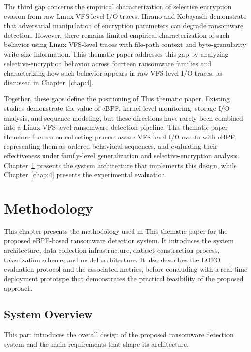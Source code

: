 The third gap concerns the empirical characterization of selective encryption evasion from raw Linux VFS-level I/\allowbreak{}O traces. Hirano and Kobayashi \cite{ref8} demonstrate that adversarial manipulation of encryption parameters can degrade ransomware detection. However, there remains limited empirical characterization of such behavior using Linux VFS-level traces with file-path context and byte-granularity write-size information. This thematic paper addresses this gap by analyzing selective-encryption behavior across fourteen ransomware families and characterizing how such behavior appears in raw VFS-level I/\allowbreak{}O traces, as discussed in Chapter~\ref{chap:4}.

Together, these gaps define the positioning of This thematic paper. Existing studies demonstrate the value of eBPF, kernel-level monitoring, storage I/\allowbreak{}O analysis, and sequence modeling, but these directions have rarely been combined into a Linux VFS-level ransomware detection pipeline. This thematic paper therefore focuses on collecting process-aware VFS-level I/\allowbreak{}O events with eBPF, representing them as ordered behavioral sequences, and evaluating their effectiveness under family-level generalization and selective-encryption analysis. Chapter~\ref{chap:3} presents the system architecture that implements this design, while Chapter~\ref{chap:4} presents the experimental evaluation.

\chapter{Methodology}\label{chap:3}

This chapter presents the methodology used in This thematic paper for the proposed eBPF-based ransomware detection system. It introduces the system architecture, data collection infrastructure, dataset construction process, tokenization scheme, and model architecture. It also describes the LOFO evaluation protocol and the associated metrics, before concluding with a real-time deployment prototype that demonstrates the practical feasibility of the proposed approach.

\section{System Overview}\label{sec:3.1}

This part introduces the overall design of the proposed ransomware detection system and the main requirements that shape its architecture.

